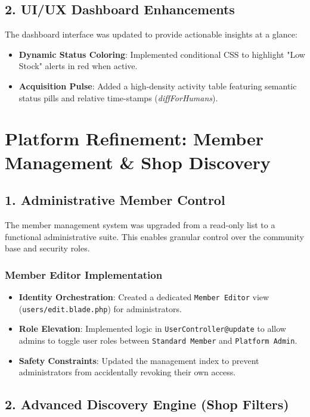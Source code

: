 \documentclass[12pt,a4paper]{article}
\begin{document}
\subsection{2. UI/UX Dashboard Enhancements}

The dashboard interface was updated to provide actionable insights at a glance:
\begin{itemize}
    \item \textbf{Dynamic Status Coloring}: Implemented conditional CSS to highlight "Low Stock" alerts in red when active.
    \item \textbf{Acquisition Pulse}: Added a high-density activity table featuring semantic status pills and relative time-stamps (\textit{diffForHumans}).
\end{itemize}

\section{Platform Refinement: Member Management \& Shop Discovery}

\subsection{1. Administrative Member Control}

The member management system was upgraded from a read-only list to a functional administrative suite. This enables granular control over the community base and security roles.

\subsubsection{Member Editor Implementation}
\begin{itemize}
    \item \textbf{Identity Orchestration}: Created a dedicated \texttt{Member Editor} view (\texttt{users/edit.blade.php}) for administrators.
    \item \textbf{Role Elevation}: Implemented logic in \texttt{UserController@update} to allow admins to toggle user roles between \texttt{Standard Member} and \texttt{Platform Admin}.
    \item \textbf{Safety Constraints}: Updated the management index to prevent administrators from accidentally revoking their own access.
\end{itemize}

\subsection{2. Advanced Discovery Engine (Shop Filters)}
\end{document}
